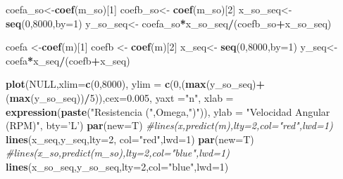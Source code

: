 \documentclass[]{article}
\newenvironment{Shaded}{\begin{snugshade}}{\end{snugshade}}
\newcommand{\KeywordTok}[1]{\textcolor[rgb]{0.13,0.29,0.53}{\textbf{#1}}}
\newcommand{\DataTypeTok}[1]{\textcolor[rgb]{0.13,0.29,0.53}{#1}}
\newcommand{\DecValTok}[1]{\textcolor[rgb]{0.00,0.00,0.81}{#1}}
\newcommand{\FloatTok}[1]{\textcolor[rgb]{0.00,0.00,0.81}{#1}}
\newcommand{\StringTok}[1]{\textcolor[rgb]{0.31,0.60,0.02}{#1}}
\newcommand{\CommentTok}[1]{\textcolor[rgb]{0.56,0.35,0.01}{\textit{#1}}}
\newcommand{\OtherTok}[1]{\textcolor[rgb]{0.56,0.35,0.01}{#1}}
\newcommand{\OperatorTok}[1]{\textcolor[rgb]{0.81,0.36,0.00}{\textbf{#1}}}
\newcommand{\NormalTok}[1]{#1}
\begin{document}
\begin{Shaded}
\begin{Highlighting}[]
{{{    
    
    
\NormalTok{    coefa_so<-}\KeywordTok{coef}\NormalTok{(m_so)[}\DecValTok{1}\NormalTok{]}
\NormalTok{    coefb_so<-}\StringTok{ }\KeywordTok{coef}\NormalTok{(m_so)[}\DecValTok{2}\NormalTok{]}
\NormalTok{    x_so_seq<-}\StringTok{ }\KeywordTok{seq}\NormalTok{(}\DecValTok{0}\NormalTok{,}\DecValTok{8000}\NormalTok{,}\DataTypeTok{by=}\DecValTok{1}\NormalTok{)}
\NormalTok{    y_so_seq<-}\StringTok{ }\NormalTok{coefa_so}\OperatorTok{*}\NormalTok{x_so_seq}\OperatorTok{/}\NormalTok{(coefb_so}\OperatorTok{+}\NormalTok{x_so_seq)}
    
\NormalTok{    coefa <-}\KeywordTok{coef}\NormalTok{(m)[}\DecValTok{1}\NormalTok{]}
\NormalTok{    coefb <-}\StringTok{ }\KeywordTok{coef}\NormalTok{(m)[}\DecValTok{2}\NormalTok{]}
\NormalTok{    x_seq<-}\StringTok{ }\KeywordTok{seq}\NormalTok{(}\DecValTok{0}\NormalTok{,}\DecValTok{8000}\NormalTok{,}\DataTypeTok{by=}\DecValTok{1}\NormalTok{)}
\NormalTok{    y_seq<-}\StringTok{ }\NormalTok{coefa}\OperatorTok{*}\NormalTok{x_seq}\OperatorTok{/}\NormalTok{(coefb}\OperatorTok{+}\NormalTok{x_seq)}
    
    
    
    
    
    \KeywordTok{plot}\NormalTok{(}\OtherTok{NULL}\NormalTok{,}\DataTypeTok{xlim=}\KeywordTok{c}\NormalTok{(}\DecValTok{0}\NormalTok{,}\DecValTok{8000}\NormalTok{),}
         \DataTypeTok{ylim =} \KeywordTok{c}\NormalTok{(}\DecValTok{0}\NormalTok{,(}\KeywordTok{max}\NormalTok{(y_so_seq)}\OperatorTok{+}\NormalTok{(}\KeywordTok{max}\NormalTok{(y_so_seq))}\OperatorTok{/}\DecValTok{5}\NormalTok{)),}\DataTypeTok{cex=}\FloatTok{0.005}\NormalTok{, }\DataTypeTok{yaxt =}\StringTok{"n"}\NormalTok{,}
         \DataTypeTok{xlab =}  \KeywordTok{expression}\NormalTok{(}\KeywordTok{paste}\NormalTok{(}\StringTok{"Resistencia ("}\NormalTok{,Omega,}\StringTok{")"}\NormalTok{)), }\DataTypeTok{ylab =} \StringTok{"Velocidad Angular (RPM)"}\NormalTok{, }\DataTypeTok{bty=}\StringTok{'L'}\NormalTok{)}
    \KeywordTok{par}\NormalTok{(}\DataTypeTok{new=}\NormalTok{T)}
    \CommentTok{#lines(x,predict(m),lty=2,col="red",lwd=1)}
    \KeywordTok{lines}\NormalTok{(x_seq,y_seq,}\DataTypeTok{lty=}\DecValTok{2}\NormalTok{, }\DataTypeTok{col=}\StringTok{"red"}\NormalTok{,}\DataTypeTok{lwd=}\DecValTok{1}\NormalTok{)}
    \KeywordTok{par}\NormalTok{(}\DataTypeTok{new=}\NormalTok{T)}
    \CommentTok{#lines(x_so,predict(m_so),lty=2,col="blue",lwd=1)}
    \KeywordTok{lines}\NormalTok{(x_so_seq,y_so_seq,}\DataTypeTok{lty=}\DecValTok{2}\NormalTok{,}\DataTypeTok{col=}\StringTok{"blue"}\NormalTok{,}\DataTypeTok{lwd=}\DecValTok{1}\NormalTok{)}
    
}}}
\end{Highlighting}
\end{Shaded}
\end{document}
